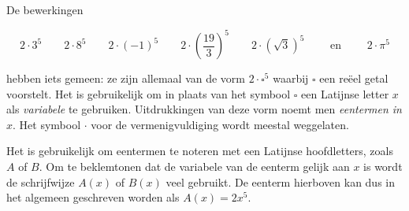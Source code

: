 \documentclass{ximera}
\begin{document}
	\author{Koen de Naeghel - Wiskunde Op Maat}
    \xmsource

	


De bewerkingen

\[
2\cdot 3^5
\qquad 2\cdot 8^5
\qquad 2\cdot (-1)^5
\qquad 2\cdot\left(\frac{19}{3}\right)^5
\qquad 2\cdot\left(\sqrt{3}\right)^5 
\qquad \text{ en } \qquad 2 \cdot \pi^5
\]


hebben iets gemeen: ze zijn allemaal van de vorm \(2\cdot \square^5\) waarbij \(\square\) een reëel getal voorstelt. Het is gebruikelijk om in plaats van het symbool \(\square\) een Latijnse letter \(x\) als \textit{ variabele} te gebruiken. Uitdrukkingen van deze vorm noemt men \textit{ eentermen in \(x\)}. Het symbool \(\cdot\) voor de vermenigvuldiging wordt meestal weggelaten. 

Het is gebruikelijk om eentermen te noteren met een Latijnse hoofdletters, zoals \(A\) of \(B\). Om te beklemtonen dat de variabele van de eenterm gelijk aan \(x\) is wordt de schrijfwijze \(A(x)\) of \(B(x)\) veel gebruikt. De eenterm hierboven kan dus in het algemeen geschreven worden als \(A(x) = 2x^5\).

\end{document}
